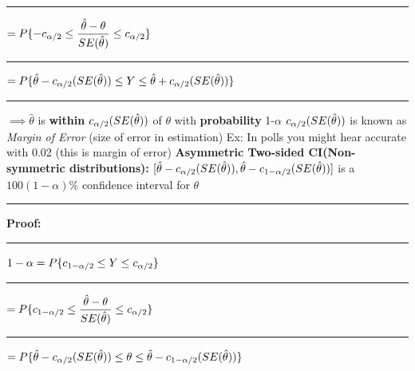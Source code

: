 \documentclass[]{article}
\begin{document}
\newline
\newline\Large\rule{4.3cm}{0pt}  $=  P \{ -c_{\alpha \\/ 2} \le \dfrac{\hat{\theta} - \theta}{ SE(\hat{\theta})}  \le c_{\alpha \\/ 2}  \}$
\newline
\newline\Large\rule{4.3cm}{0pt}  $=  P \{ \hat\theta -c_{\alpha \\/ 2} (SE(\hat\theta))  \le Y \le \hat\theta +c_{\alpha \\/ 2}(SE(\hat\theta))  \} $
\newline
\newline\Large\rule{4.3cm}{0pt} $\implies \hat\theta$ is \textbf{within} $c_{\alpha \\/ 2} (SE(\hat\theta))$ of $\theta$ with \textbf{probability}  1-$\alpha$
\newline
\newline $c_{\alpha \\/ 2} (SE(\hat\theta))$ is known as \textit{Margin of Error} (size of error in estimation)
\newline Ex: In polls you might hear accurate with 0.02 (this is margin of error)
\newline
\newline\Large\textbf{Asymmetric Two-sided CI(Non-symmetric distributions):}
\newline $[ \hat\theta - c_{\alpha \\/ 2}(SE(\hat\theta)),  \hat\theta - c_{1- \alpha \\/ 2}(SE(\hat\theta))]$ is a $100(1-\alpha)\%$ confidence interval for $\theta$
\newline 
\newline\Large\rule{3.0cm}{0pt} \textbf{Proof:}
\newline\Large\rule{3.0cm}{0pt}  $ 1 - \alpha =  P \{ c_{1- \alpha \\/ 2} \le Y \le c_{\alpha \\/ 2}  \}$
\newline
\newline\Large\rule{4.3cm}{0pt}  $=  P \{ c_{1- \alpha \\/ 2} \le \dfrac{\hat{\theta} - \theta}{ SE(\hat{\theta})}  \le c_{\alpha \\/ 2}  \}$
\newline
\newline\Large\rule{4.3cm}{0pt}  $=  P \{ \hat\theta - c_{\alpha \\/ 2}(SE(\hat\theta))  \le \theta \le \hat\theta - c_{1- \alpha \\/ 2}(SE(\hat\theta))  \} $
\end{document}

